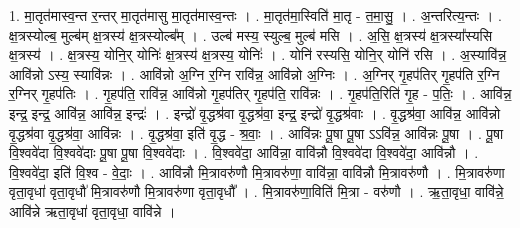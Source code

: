 \documentclass[17pt]{extarticle}
\begin{document}
1. मा॒तृत॑मास्व॒न्त र॒न्तर् मा॒तृत॑मासु मा॒तृत॑मास्व॒न्तः । . मा॒तृत॑मा॒स्विति॑ मा॒तृ - त॒मा॒सु॒ । . अ॒न्तरित्य॒न्तः । . क्ष॒त्रस्योल्ब॒ मुल्ब॑म् क्ष॒त्रस्य॑ क्ष॒त्रस्योल्ब᳚म् । . उल्ब॑ मस्य॒ स्युल्ब॒ मुल्ब॑ मसि । . अ॒सि॒ क्ष॒त्रस्य॑ क्ष॒त्रस्या᳚स्यसि क्ष॒त्रस्य॑ । . क्ष॒त्रस्य॒ योनि॒र् योनिः॑ क्ष॒त्रस्य॑ क्ष॒त्रस्य॒ योनिः॑ । . योनि॑ रस्यसि॒ योनि॒र् योनि॑ रसि । . अ॒स्यावि॑न्न॒ आवि॑न्नो ऽस्य॒ स्यावि॑न्नः । . आवि॑न्नो अ॒ग्नि र॒ग्नि रावि॑न्न॒ आवि॑न्नो अ॒ग्निः । . अ॒ग्निर् गृ॒हप॑तिर् गृ॒हप॑ति र॒ग्नि र॒ग्निर् गृ॒हप॑तिः । . गृ॒हप॑ति॒ रावि॑न्न॒ आवि॑न्नो गृ॒हप॑तिर् गृ॒हप॑ति॒ रावि॑न्नः । . गृ॒हप॑ति॒रिति॑ गृ॒ह - प॒तिः॒ । . आवि॑न्न॒ इन्द्र॒ इन्द्र॒ आवि॑न्न॒ आवि॑न्न॒ इन्द्रः॑ । . इन्द्रो॑ वृ॒द्धश्र॑वा वृ॒द्धश्र॑वा॒ इन्द्र॒ इन्द्रो॑ वृ॒द्धश्र॑वाः । . वृ॒द्धश्र॑वा॒ आवि॑न्न॒ आवि॑न्नो वृ॒द्धश्र॑वा वृ॒द्धश्र॑वा॒ आवि॑न्नः । . वृ॒द्धश्र॑वा॒ इति॑ वृ॒द्ध - श्र॒वाः॒ । . आवि॑न्नः पू॒षा पू॒षा ऽऽवि॑न्न॒ आवि॑न्नः पू॒षा । . पू॒षा वि॒श्ववे॑दा वि॒श्ववे॑दाः पू॒षा पू॒षा वि॒श्ववे॑दाः । . वि॒श्ववे॑दा॒ आवि॑न्ना॒ वावि॑न्नौ वि॒श्ववे॑दा वि॒श्ववे॑दा॒ आवि॑न्नौ । . वि॒श्ववे॑दा॒ इति॑ वि॒श्व - वे॒दाः॒ । . आवि॑न्नौ मि॒त्रावरु॑णौ मि॒त्रावरु॑णा॒ वावि॑न्ना॒ वावि॑न्नौ मि॒त्रावरु॑णौ । . मि॒त्रावरु॑णा वृता॒वृधा॑ वृता॒वृधौ॑ मि॒त्रावरु॑णौ मि॒त्रावरु॑णा वृता॒वृधौ᳚ । . मि॒त्रावरु॑णा॒विति॑ मि॒त्रा - वरु॑णौ । . ऋ॒ता॒वृधा॒ वावि॑न्ने॒ आवि॑न्ने ऋता॒वृधा॑ वृता॒वृधा॒ वावि॑न्ने । \newline
\end{document}

